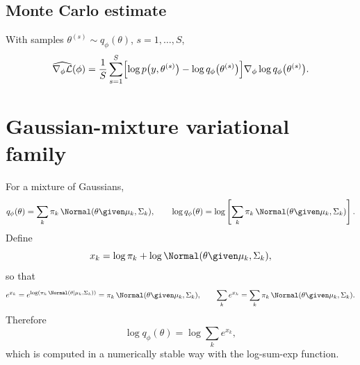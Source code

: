 \subsection{Monte Carlo estimate}
With samples $\theta^{(s)} \sim q_\phi(\theta)$, $s = 1, \dots, S$,
\[
\widehat{\nabla_\phi\mathcal{L}}(\phi) = \frac{1}{S}\sum_{s=1}^{S}\Bigl[\log p\bigl(y, \theta^{(s)}\bigr) - \log q_\phi\bigl(\theta^{(s)}\bigr)\Bigr]\nabla_\phi\log q_\phi\bigl(\theta^{(s)}\bigr).
\]

\section{Gaussian-mixture variational family}
For a mixture of Gaussians,
\[
q_\phi(\theta) = \sum_k \pi_k\,\Normal(\theta \given \mu_k, \Sigma_k),
\qquad
\log q_\phi(\theta) = \log\left[\sum_k \pi_k\,\Normal(\theta \given \mu_k, \Sigma_k)\right].
\]
Define
\[
x_k = \log\pi_k + \log\Normal(\theta \given \mu_k, \Sigma_k),
\]
so that
\[
e^{x_k} = e^{\log(\pi_k\,\Normal(\theta \mid \mu_k, \Sigma_k))} = \pi_k\,\Normal(\theta \given \mu_k, \Sigma_k),
\qquad
\sum_k e^{x_k} = \sum_k \pi_k\,\Normal(\theta \given \mu_k, \Sigma_k).
\]
Therefore
\[
\log q_\phi(\theta) = \log\sum_k e^{x_k},
\]
which is computed in a numerically stable way with the log-sum-exp function.


